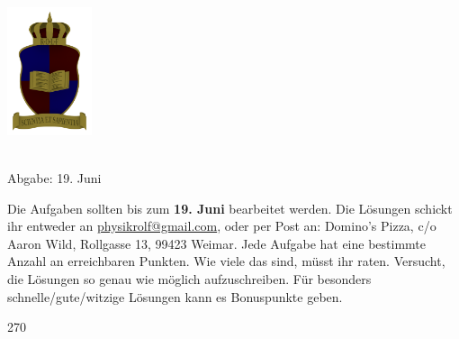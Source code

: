 \documentclass[a4paper]{article}
\numberwithin{equation}{Exercise}
\begin{document}
	\vspace*{-2cm}
	\parbox{4cm}{\includegraphics[width=2.5cm]{../images/ROLF4.png}}
	\parbox{10.6cm}{ \\ Abgabe: 19. Juni \\ \vspace*{-.5cm} }
	
	

\thispagestyle{empty}
\begin{framed}
	\noindent
	\scriptsize
	Die Aufgaben sollten bis zum \textbf{19. Juni} bearbeitet werden. Die Lösungen schickt ihr entweder an \href{mailto:physikrolf@gmail.com}{physikrolf@gmail.com}, oder per Post an: Domino's Pizza, c/o Aaron Wild, Rollgasse 13, 99423 Weimar.
	Jede Aufgabe hat eine bestimmte Anzahl an erreichbaren Punkten. Wie viele das sind, müsst ihr raten. Versucht, die Lösungen so genau wie möglich aufzuschreiben. Für besonders schnelle/gute/witzige Lösungen kann es Bonuspunkte geben.
\end{framed}

\noindent









\newpage
\begin{turn}{270}

\end{turn}
\end{document}
